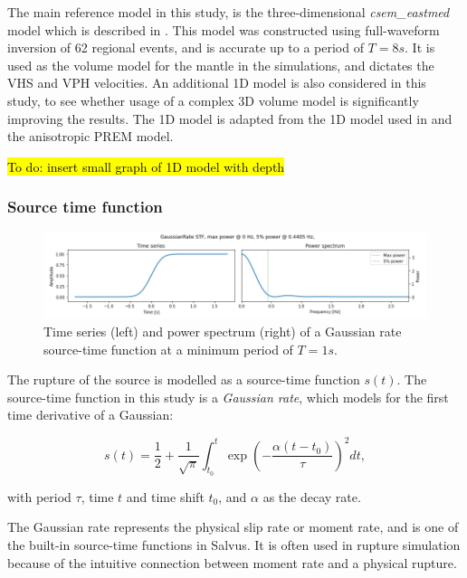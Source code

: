 \documentclass[../Text/00main.tex]{subfiles}
\begin{document}
The main reference model in this study, is the three-dimensional \textit{csem\_eastmed} model which is described in \cite{cubuk-sabuncu_3-d_2017}. This model was constructed using full-waveform inversion of 62 regional events, and is accurate up to a period of $T = 8 s$. It is used as the volume model for the mantle in the simulations, and dictates the VHS and VPH velocities. An additional 1D model is also considered in this study, to see whether usage of a complex 3D volume model is significantly improving the results. The 1D model is adapted from the 1D model used in \cite{pulido_sensitivity_2007} and the anisotropic PREM model. 

\hl{To do: insert small graph of 1D model with depth}


\subsubsection{Source time function}

\begin{figure}[h!]
    \centering
    \includegraphics{images_methods/GR_stf_image.png}
    \caption{Time series (left) and power spectrum (right) of a Gaussian rate source-time function at a minimum period of $ T=1 s$.}
    \label{fig:Gaussian_rate_stf}
\end{figure}

The rupture of the source is modelled as a source-time function $s(t)$. The source-time function in this study is a\textit{ Gaussian rate}, which models for the first time derivative of a Gaussian: 

\begin{equation}
s(t)=\frac{1}{2}+\frac{1}{\sqrt{\pi}} \int_{t_{0}}^{t} \exp \left(-\frac{\alpha\left(t-t_{0}\right)}{\tau}\right)^{2} dt , 
\label{eq:Gaussianrate}
\end{equation}

with period $\tau$, time $t$ and time shift $t_0$, and $\alpha$ as the decay rate.  

The Gaussian rate represents the physical slip rate or moment rate, and is one of the built-in source-time functions in Salvus. It is often used in rupture simulation because of the intuitive connection between moment rate and a physical rupture. 
\end{document}
